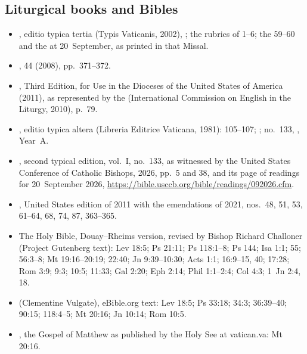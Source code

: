 {\small
\subsection*{Liturgical books and Bibles}
\begin{itemize}[itemsep=0pt,topsep=.25em]
\item {}, editio typica tertia (Typis Vaticanis, 2002), ; the rubrics of  1--6; the  59--60 and the  at 20~September, as printed in that Missal.
\item {},  44 (2008), pp.~371--372.
\item {}, Third Edition, for Use in the Dioceses of the United States of America (2011), as represented by the  (International Commission on English in the Liturgy, 2010), p.~79.
\item {}, editio typica altera (Libreria Editrice Vaticana, 1981):  105--107; ; no.~133, , Year~A.
\item {}, second typical edition, vol.~I, no.~133, as witnessed by the United States Conference of Catholic Bishops,  2026, pp.~5 and 38, and its page of readings for 20~September 2026, \url{https://bible.usccb.org/bible/readings/092026.cfm}.
\item {}, United States edition of 2011 with the emendations of 2021, nos.~48, 51, 53, 61--64, 68, 74, 87, 363--365.
\item The Holy Bible, Douay--Rheims version, revised by Bishop Richard Challoner (Project Gutenberg text): Lev 18:5; Ps 21:11; Ps 118:1--8; Ps 144; Isa 1:1; 55; 56:3--8; Mt 19:16--20:19; 22:40; Jn 9:39--10:30; Acts 1:1; 16:9--15, 40; 17:28; Rom 3:9; 9:3; 10:5; 11:33; Gal 2:20; Eph 2:14; Phil 1:1--2:4; Col 4:3; 1~Jn 2:4, 18.
\item {} (Clementine Vulgate), eBible.org text: Lev 18:5; Ps 33:18; 34:3; 36:39--40; 90:15; 118:4--5; Mt 20:16; Jn 10:14; Rom 10:5.
\item {}, the Gospel of Matthew as published by the Holy See at vatican.va: Mt 20:16.
\end{itemize}

}
